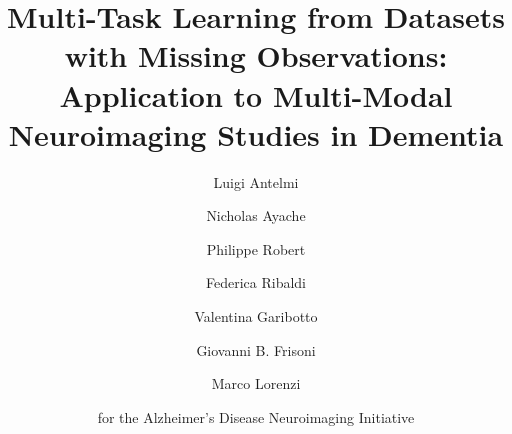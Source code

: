 \documentclass[final,5p,times,twocolumn,authoryear]{elsarticle}
\begin{document}
\begin{frontmatter}



\title{
Multi-Task Learning from Datasets with Missing Observations:
Application to Multi-Modal Neuroimaging Studies in Dementia
}

\author{Luigi Antelmi }
\author{Nicholas Ayache }
\author{Philippe Robert}
%
\author{Federica Ribaldi}
\author{Valentina Garibotto}
\author{Giovanni B. Frisoni}
%
\author{Marco Lorenzi}
%
\author{for the Alzheimer's Disease Neuroimaging Initiative }


\end{frontmatter}
\end{document}
